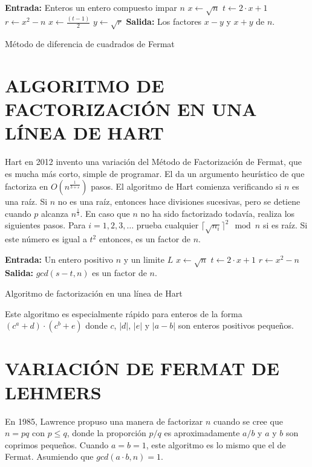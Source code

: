 \documentclass[12pt,letterpaper]{book}
\begin{document}
    \begin{algorithm}[H]
        \SetAlgoLined
        \textbf{Entrada:} Enteros un entero compuesto impar $n$ \;
        $x \leftarrow \sqrt{n}$\;
        $t \leftarrow 2\cdot x + 1$\;
        $r \leftarrow x^{2} - n $\;
        $x \leftarrow \frac{(t - 1)}{2}$\;
        $y \leftarrow \sqrt{r}$\;
        \textbf{Salida:} Los factores $x-y$ y $x+y$ de $n$.\ 
        \caption{Método de diferencia de cuadrados de Fermat}
    \end{algorithm}

    \section{ALGORITMO DE FACTORIZACIÓN EN UNA LÍNEA DE HART}
    Hart en 2012 invento una variación del Método de Factorización de Fermat, que es mucha más corto, simple de programar. El da un argumento heurístico de que factoriza  en $O(n^{\frac{1}{3+ \varepsilon}})$ pasos.
    El algoritmo de Hart comienza verificando si $n$ es una raíz. Si $n$ no es una raíz, entonces hace divisiones sucesivas, pero se detiene cuando $p$ alcanza $n^{\frac{1}{3}}$. En caso que $n$ no ha sido factorizado todavía, realiza los siguientes pasos.
    Para $i=1, 2, 3, \dots $ prueba cualquier $\lceil\sqrt{n_{i}}\rceil^{2} \mod n$ si es raíz. Si este número es igual a $t^{2}$ entonces, es un factor de $n$. 
    \begin{algorithm}[H]
        \SetAlgoLined
        \textbf{Entrada:} Un entero positivo $n$ y un limite $L$ \;
        $x \leftarrow \sqrt{n}$\;
        $t \leftarrow 2\cdot x + 1$\;
        $r \leftarrow x^{2} - n $\;
        \textbf{Salida:} $gcd(s-t, n)$ es un factor de $n$.\ 
        \caption{Algoritmo de factorización en una línea de Hart}
    \end{algorithm}

    Este algoritmo es especialmente rápido para enteros de la forma $(c^{a} + d)\cdot (c^{b} + e)$ donde $c$, $|d|$, $|e|$ y $|a-b|$ son enteros positivos pequeños.

    \section{VARIACIÓN DE FERMAT DE LEHMERS}
    En 1985, Lawrence propuso una manera de factorizar $n$ cuando se cree que $n=pq$ con $p \leq q$, donde la proporción $p/q$ es aproximadamente $a/b$ y $a$ y $b$ son coprimos pequeños. Cuando $a=b=1$, este algoritmo es lo mismo que el de Fermat. Asumiendo que $gcd(a\cdot b, n) = 1$.
    
\end{document}
